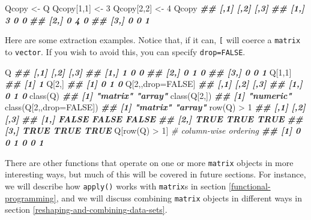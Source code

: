 \documentclass[
  12pt,
]{krantz}
\makeatletter
\newenvironment{Shaded}{\begin{snugshade}}{\end{snugshade}}
\newcommand{\AttributeTok}[1]{\textcolor[rgb]{0.61,0.61,0.61}{#1}}
\newcommand{\CommentTok}[1]{\textcolor[rgb]{0.37,0.37,0.37}{\textit{#1}}}
\newcommand{\ConstantTok}[1]{\textcolor[rgb]{0,0,0}{#1}}
\newcommand{\DecValTok}[1]{\textcolor[rgb]{0.06,0.06,0.06}{#1}}
\newcommand{\DocumentationTok}[1]{\textcolor[rgb]{0.37,0.37,0.37}{\textbf{\textit{#1}}}}
\newcommand{\FunctionTok}[1]{\textcolor[rgb]{0,0,0}{#1}}
\newcommand{\NormalTok}[1]{#1}
\newcommand{\OtherTok}[1]{\textcolor[rgb]{0.37,0.37,0.37}{#1}}
\newcommand{\SpecialCharTok}[1]{\textcolor[rgb]{0,0,0}{#1}}
\newenvironment{kframe}{%
\medskip{}
\setlength{\fboxsep}{.8em}
 \def\at@end@of@kframe{}%
 \ifinner\ifhmode%
  \def\at@end@of@kframe{\end{minipage}}%
  \begin{minipage}{\columnwidth}%
 \fi\fi%
 \def\FrameCommand##1{\hskip\@totalleftmargin \hskip-\fboxsep
 \colorbox{shadecolor}{##1}\hskip-\fboxsep
     \hskip-\linewidth \hskip-\@totalleftmargin \hskip\columnwidth}%
 \MakeFramed {\advance\hsize-\width
   \@totalleftmargin\z@ \linewidth\hsize
   \@setminipage}}%
 {\par\unskip\endMakeFramed%
 \at@end@of@kframe}
\renewenvironment{Shaded}{\begin{kframe}}{\end{kframe}}
\makeatother
\begin{document}
\begin{Shaded}
\begin{Highlighting}[]
\NormalTok{Qcopy }\OtherTok{\textless{}{-}}\NormalTok{ Q}
\NormalTok{Qcopy[}\DecValTok{1}\NormalTok{,}\DecValTok{1}\NormalTok{] }\OtherTok{\textless{}{-}} \DecValTok{3}
\NormalTok{Qcopy[}\DecValTok{2}\NormalTok{,}\DecValTok{2}\NormalTok{] }\OtherTok{\textless{}{-}} \DecValTok{4}
\NormalTok{Qcopy}
\DocumentationTok{\#\#      [,1] [,2] [,3]}
\DocumentationTok{\#\# [1,]    3    0    0}
\DocumentationTok{\#\# [2,]    0    4    0}
\DocumentationTok{\#\# [3,]    0    0    1}
\end{Highlighting}
\end{Shaded}

Here are some extraction examples. Notice that, if it can, \texttt{{[}} will coerce a \texttt{matrix} to \texttt{vector}. If you wish to avoid this, you can specify \texttt{drop=FALSE}.

\begin{Shaded}
\begin{Highlighting}[]
\NormalTok{Q}
\DocumentationTok{\#\#      [,1] [,2] [,3]}
\DocumentationTok{\#\# [1,]    1    0    0}
\DocumentationTok{\#\# [2,]    0    1    0}
\DocumentationTok{\#\# [3,]    0    0    1}
\NormalTok{Q[}\DecValTok{1}\NormalTok{,}\DecValTok{1}\NormalTok{]}
\DocumentationTok{\#\# [1] 1}
\NormalTok{Q[}\DecValTok{2}\NormalTok{,]}
\DocumentationTok{\#\# [1] 0 1 0}
\NormalTok{Q[}\DecValTok{2}\NormalTok{,,drop}\OtherTok{=}\ConstantTok{FALSE}\NormalTok{]}
\DocumentationTok{\#\#      [,1] [,2] [,3]}
\DocumentationTok{\#\# [1,]    0    1    0}
\FunctionTok{class}\NormalTok{(Q)}
\DocumentationTok{\#\# [1] "matrix" "array"}
\FunctionTok{class}\NormalTok{(Q[}\DecValTok{2}\NormalTok{,])}
\DocumentationTok{\#\# [1] "numeric"}
\FunctionTok{class}\NormalTok{(Q[}\DecValTok{2}\NormalTok{,,}\AttributeTok{drop=}\ConstantTok{FALSE}\NormalTok{])  }
\DocumentationTok{\#\# [1] "matrix" "array"}
\FunctionTok{row}\NormalTok{(Q) }\SpecialCharTok{\textgreater{}} \DecValTok{1}
\DocumentationTok{\#\#       [,1]  [,2]  [,3]}
\DocumentationTok{\#\# [1,] FALSE FALSE FALSE}
\DocumentationTok{\#\# [2,]  TRUE  TRUE  TRUE}
\DocumentationTok{\#\# [3,]  TRUE  TRUE  TRUE}
\NormalTok{Q[}\FunctionTok{row}\NormalTok{(Q) }\SpecialCharTok{\textgreater{}} \DecValTok{1}\NormalTok{] }\CommentTok{\# column{-}wise ordering}
\DocumentationTok{\#\# [1] 0 0 1 0 0 1}
\end{Highlighting}
\end{Shaded}

There are other functions that operate on one or more \texttt{matrix} objects in more interesting ways, but much of this will be covered in future sections. For instance, we will describe how \texttt{apply()} works with \texttt{matrix}s in section \ref{functional-programming}, and we will discuss combining \texttt{matrix} objects in different ways in section \ref{reshaping-and-combining-data-sets}.
\end{document}
